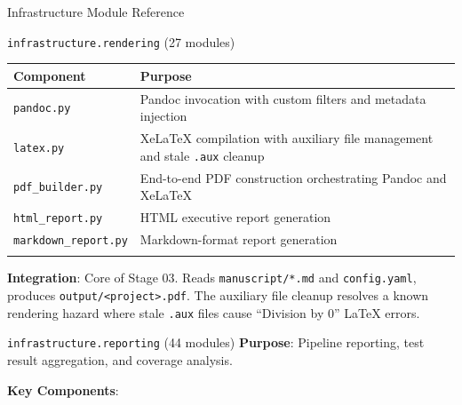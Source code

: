 \documentclass[
  ignorenonframetext,
]{beamer}
\newcounter{none} %
\begin{document}
\begin{frame}[fragile]{Infrastructure Module Reference}
\begin{block}{\texttt{infrastructure.rendering} (27 modules)}
{\def\LTcaptype{none} %
\begin{longtable}[]{@{}
  >{\raggedright\arraybackslash}p{}
  >{\raggedright\arraybackslash}p{}@{}}
\toprule\noalign{}
\begin{minipage}[b]{\linewidth}\raggedright
Component
\end{minipage} & \begin{minipage}[b]{\linewidth}\raggedright
Purpose
\end{minipage} \\
\midrule\noalign{}
\endhead
\texttt{pandoc.py} & Pandoc invocation with custom filters and metadata
injection \\
\texttt{latex.py} & XeLaTeX compilation with auxiliary file management
and stale \texttt{.aux} cleanup \\
\texttt{pdf\_builder.py} & End-to-end PDF construction orchestrating
Pandoc and XeLaTeX \\
\texttt{html\_report.py} & HTML executive report generation \\
\texttt{markdown\_report.py} & Markdown-format report generation \\
\bottomrule\noalign{}
\end{longtable}
}

\textbf{Integration}: Core of Stage 03. Reads \texttt{manuscript/*.md}
and \texttt{config.yaml}, produces
\texttt{output/\textless{}project\textgreater{}.pdf}. The auxiliary file
cleanup resolves a known rendering hazard where stale \texttt{.aux}
files cause ``Division by 0'' LaTeX errors.
\end{block}

\begin{block}{\texttt{infrastructure.reporting} (44 modules)}
\protect{}\label{infrastructure.reporting-44-modules}
\textbf{Purpose}: Pipeline reporting, test result aggregation, and
coverage analysis.

\textbf{Key Components}:


\end{block}
\end{frame}
\end{document}
